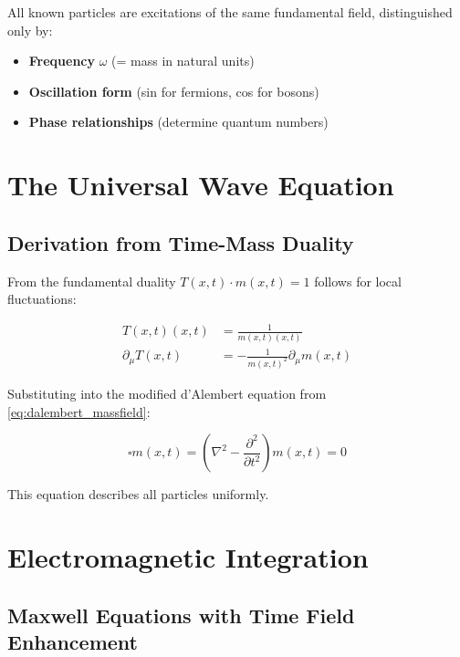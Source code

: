 \documentclass[12pt,a4paper]{report}
\newcommand{\Tfield}{T(x,t)}  %
\newcommand{\mfield}{m(x,t)}  %
\begin{document}
	All known particles are excitations of the same fundamental field, distinguished only by:
	\begin{itemize}
		\item \textbf{Frequency} $\omega$ (= mass in natural units)
		\item \textbf{Oscillation form} (sin for fermions, cos for bosons)
		\item \textbf{Phase relationships} (determine quantum numbers)
	\end{itemize}
	
	\section{The Universal Wave Equation}\label{sec:universal_wave_equation}
	
	\subsection{Derivation from Time-Mass Duality}\label{subsec:derivation_wave_equation}
	
	From the fundamental duality $\Tfield \cdot \mfield = 1$ follows for local fluctuations:
	
	\begin{align}
		\Tfield(x,t) &= \frac{1}{\mfield(x,t)} \\
		\partial_\mu \Tfield &= -\frac{1}{\mfield^2} \partial_\mu \mfield
	\end{align}
	
	Substituting into the modified d'Alembert equation from \autoref{eq:dalembert_massfield}:
	
	\begin{equation}\label{eq:universal_wave_equation}
		\square \mfield = \left(\nabla^2 - \frac{\partial^2}{\partial t^2}\right) \mfield = 0
	\end{equation}
	
	This equation describes all particles uniformly.
	
	\section{Electromagnetic Integration}\label{sec:electromagnetic_integration}
	
	\subsection{Maxwell Equations with Time Field Enhancement}\label{subsec:maxwell_timefield}
	
\end{document}
